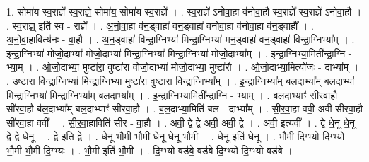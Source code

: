 \documentclass[17pt]{extarticle}
\begin{document}
1. सोमा॑य स्व॒राज्ञे᳚ स्व॒राज्ञे॒ सोमा॑य॒ सोमा॑य स्व॒राज्ञे᳚ । . स्व॒राज्ञे॑ ऽनोवा॒हा व॑नोवा॒हौ स्व॒राज्ञे᳚ स्व॒राज्ञे॑ ऽनोवा॒हौ । . स्व॒राज्ञ्॒ इति॑ स्व - राज्ञे᳚ । . अ॒नो॒वा॒हा व॑न॒ड्वाहा॑ वन॒ड्वाहा॑ वनोवा॒हा व॑नोवा॒हा व॑न॒ड्वाहौ᳚ । . अ॒नो॒वा॒हावित्य॑नः - वा॒हौ । . अ॒न॒ड्वाहा॑ विन्द्रा॒ग्निभ्या॑ मिन्द्रा॒ग्निभ्या॑ मन॒ड्वाहा॑ वन॒ड्वाहा॑ विन्द्रा॒ग्निभ्या᳚म् । . इ॒न्द्रा॒ग्निभ्या॑ मोजो॒दाभ्या॑ मोजो॒दाभ्या॑ मिन्द्रा॒ग्निभ्या॑ मिन्द्रा॒ग्निभ्या॑ मोजो॒दाभ्या᳚म् । . इ॒न्द्रा॒ग्निभ्या॒मिती᳚न्द्रा॒ग्नि - भ्या॒म् । . ओ॒जो॒दाभ्या॒ मुष्टा॑रा॒ वुष्टा॑रा वोजो॒दाभ्या॑ मोजो॒दाभ्या॒ मुष्टा॑रौ । . ओ॒जो॒दाभ्या॒मित्यो॑जः - दाभ्या᳚म् । . उष्टा॑रा विन्द्रा॒ग्निभ्या॑ मिन्द्रा॒ग्निभ्या॒ मुष्टा॑रा॒ वुष्टा॑रा विन्द्रा॒ग्निभ्या᳚म् । . इ॒न्द्रा॒ग्निभ्या᳚म् बल॒दाभ्या᳚म् बल॒दाभ्या॑ मिन्द्रा॒ग्निभ्या॑ मिन्द्रा॒ग्निभ्या᳚म् बल॒दाभ्या᳚म् । . इ॒न्द्रा॒ग्निभ्या॒मिती᳚न्द्रा॒ग्नि - भ्या॒म् । . ब॒ल॒दाभ्याꣳ॑ सीरवा॒हौ सी॑रवा॒हौ ब॑ल॒दाभ्या᳚म् बल॒दाभ्याꣳ॑ सीरवा॒हौ । . ब॒ल॒दाभ्या॒मिति॑ बल - दाभ्या᳚म् । . सी॒र॒वा॒हा ववी॒ अवी॑ सीरवा॒हौ सी॑रवा॒हा ववी᳚ । . सी॒र॒वा॒हाविति॑ सीर - वा॒हौ । . अवी॒ द्वे द्वे अवी॒ अवी॒ द्वे । . अवी॒ इत्यवी᳚ । . द्वे धे॒नू धे॒नू द्वे द्वे धे॒नू । . द्वे इति॒ द्वे । . धे॒नू भौ॒मी भौ॒मी धे॒नू धे॒नू भौ॒मी । . धे॒नू इति॑ धे॒नू । . भौ॒मी दि॒ग्भ्यो दि॒ग्भ्यो भौ॒मी भौ॒मी दि॒ग्भ्यः । . भौ॒मी इति॑ भौ॒मी । . दि॒ग्भ्यो वड॑बे॒ वड॑बे दि॒ग्भ्यो दि॒ग्भ्यो वड॑बे । \newline
\end{document}
